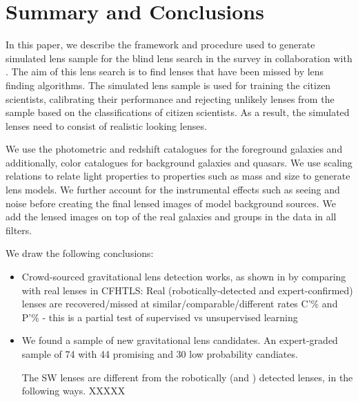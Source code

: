 \documentclass[useAMS,usenatbib,a4paper]{mn2e}
\begin{document}

\section{Summary and Conclusions}
\label{sec:conclude}
In this paper, we describe the framework and procedure used to generate
simulated lens sample for the blind lens search in the \cfhtls survey in
collaboration with \sw. The aim of this lens search is to find lenses that have
been missed by lens finding algorithms. The simulated lens sample is used for
training the citizen scientists, calibrating their performance and rejecting
unlikely lenses from the sample based on the classifications of citizen
scientists. As a result, the simulated lenses need to consist of realistic
looking lenses.

We use the photometric and redshift catalogues for the foreground galaxies and
additionally, color catalogues for background galaxies and quasars. We
use scaling relations to relate light properties to properties such as mass and
size to generate lens models. We further account for the
instrumental effects such as seeing and noise before creating the final lensed
images of model background sources. We add the lensed images on top of the real
galaxies and groups in the \cfhtls data in all filters.

We draw the following conclusions:

\begin{itemize} 

\item Crowd-sourced gravitational lens detection works, as shown in by comparing with real lenses in CFHTLS:
Real (robotically-detected and expert-confirmed) lenses are
recovered/missed at similar/comparable/different rates C’\% and P’\% - this is a partial test of supervised vs unsupervised learning


\item We found a sample of new gravitational lens candidates. An
expert-graded sample of 74 with 44 promising and 30 low probability
candiates.

The SW lenses are different from the robotically (\rf and \af) detected lenses, in the following ways.
XXXXX


\end{itemize}

\onecolumn
\end{document}
